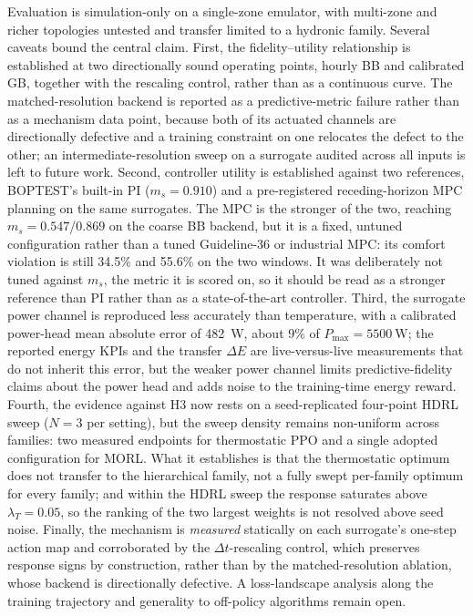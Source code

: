 \documentclass[5p]{elsarticle}
\newcommand{\ms}{\ensuremath{m_s}}
\begin{document}
Evaluation is simulation-only on a single-zone emulator, with multi-zone and richer topologies
untested and transfer limited to a hydronic family. Several caveats bound the central claim. First,
the fidelity--utility relationship is established at two directionally sound operating points,
hourly BB and calibrated GB, together with the rescaling control, rather than as a continuous curve.
The matched-resolution backend is reported as a predictive-metric failure rather than as a
mechanism data point, because both of its actuated channels are directionally defective and a
training constraint on one relocates the defect to the other; an intermediate-resolution sweep on a
surrogate audited across all inputs is left to future work.
Second, controller utility is established against two references, BOPTEST's built-in PI
($\ms=0.910$) and a pre-registered receding-horizon MPC planning on the same surrogates. The MPC is
the stronger of the two, reaching $\ms=0.547$/$0.869$ on the coarse BB backend, but it is a fixed,
untuned configuration rather than a tuned Guideline-36 or industrial MPC: its comfort violation is
still 34.5\% and 55.6\% on the two windows. It was deliberately not tuned against \ms{}, the metric
it is scored on, so it should be read as a stronger reference than PI rather than as a
state-of-the-art controller. Third, the surrogate power channel is
reproduced less accurately than temperature, with a calibrated power-head mean absolute error of
\SI{482}{\watt}, about 9\% of $P_{\max}=\SI{5500}{\watt}$; the reported energy KPIs and the transfer
$\Delta E$ are live-versus-live measurements that do not inherit this error, but the weaker power
channel limits predictive-fidelity claims about the power head and adds noise to the training-time
energy reward. Fourth, the evidence against H3 now rests on a seed-replicated four-point HDRL
sweep ($N=3$ per setting), but the sweep density remains non-uniform across families: two measured
endpoints for thermostatic PPO and a single adopted configuration for MORL. What it establishes is
that the thermostatic optimum does not transfer to the hierarchical family, not a fully swept
per-family optimum for every family; and within the HDRL sweep the response saturates above
$\lambda_T=0.05$, so the ranking of the two largest weights is not resolved above seed noise. Finally, the mechanism is
\emph{measured} statically on each surrogate's one-step action map and corroborated by the
$\Delta t$-rescaling control, which preserves response signs by construction, rather than by the
matched-resolution ablation, whose backend is directionally defective. A loss-landscape analysis
along the training trajectory and generality to off-policy algorithms remain open.
\end{document}
